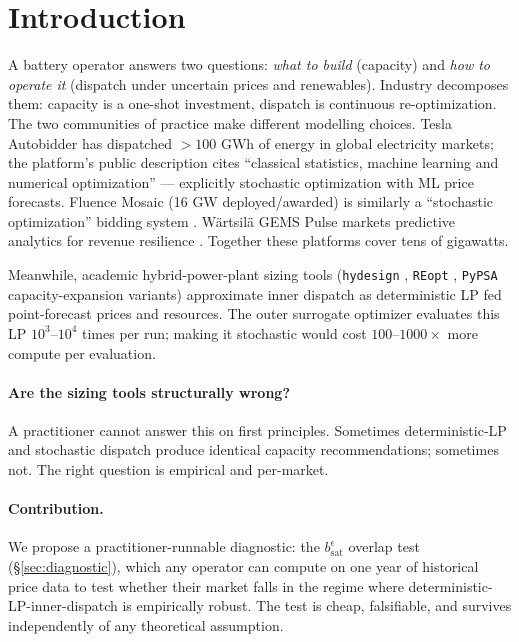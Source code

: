 \documentclass[11pt]{article}
\begin{document}
\begin{abstract}
under the in-force one-price regime they do not. The March-2025 Nordic balancing reforms sustain crisis-level spreads ($92$--$123$ EUR/MWh mean up-regulation): on the one-price/15-minute reform path, the divergence regime is plausibly the post-reform normal for wind-heavy DK1 plants. We release the benchmark (\texttt{forecast-aware-sizing}) and the diagnostic for replication on any market.
\end{abstract}

\section{Introduction}

A battery operator answers two questions: \emph{what to build} (capacity) and \emph{how to operate it} (dispatch under uncertain prices and renewables). Industry decomposes them: capacity is a one-shot investment, dispatch is continuous re-optimization. The two communities of practice make different modelling choices. Tesla Autobidder has dispatched $>100$ GWh of energy in global electricity markets; the platform's public description \citep{tesla2024autobidder} cites ``classical statistics, machine learning and numerical optimization'' --- explicitly stochastic optimization with ML price forecasts. Fluence Mosaic (16 GW deployed/awarded) is similarly a ``stochastic optimization'' bidding system \citep{fluence2024mosaic}. W\"{a}rtsil\"{a} GEMS Pulse markets predictive analytics for revenue resilience \citep{wartsila2025gems}. Together these platforms cover tens of gigawatts.

Meanwhile, academic hybrid-power-plant sizing tools (\texttt{hydesign} \citep{murcia2024hydesign}, \texttt{REopt} \citep{nrel2025bessdeg}, \texttt{PyPSA} capacity-expansion variants) approximate inner dispatch as deterministic LP fed point-forecast prices and resources. The outer surrogate optimizer evaluates this LP $10^3$--$10^4$ times per run; making it stochastic would cost $100$--$1000\times$ more compute per evaluation.

\paragraph{Are the sizing tools structurally wrong?} A practitioner cannot answer this on first principles. Sometimes deterministic-LP and stochastic dispatch produce identical capacity recommendations; sometimes not. The right question is empirical and per-market.

\paragraph{Contribution.} We propose a practitioner-runnable diagnostic: the $b_{\mathrm{sat}}^\epsilon$ overlap test (\S\ref{sec:diagnostic}), which any operator can compute on one year of historical price data to test whether their market falls in the regime where deterministic-LP-inner-dispatch is empirically robust. The test is cheap, falsifiable, and survives independently of any theoretical assumption.
\end{document}
